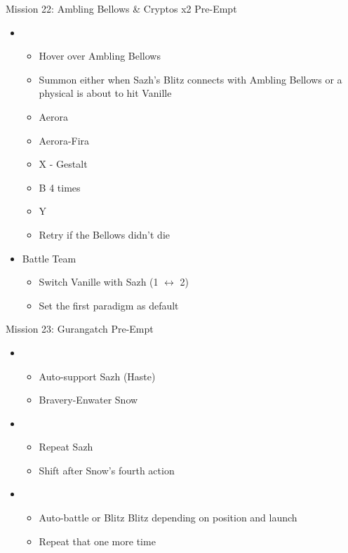 \documentclass{report}
\begin{document}
\begin{battle}{Mission 22: Ambling Bellows \& Cryptos x2 Pre-Empt}
\begin{itemize}
    \item \sixth
    \begin{itemize}
        \item Hover over Ambling Bellows
        \item Summon either when Sazh's Blitz connects with Ambling Bellows or a physical is about to hit Vanille
        \item Aerora
        \item Aerora-Fira
        \item X - Gestalt
        \item B 4 times
        \item Y
        \item Retry if the Bellows didn't die
    \end{itemize}
\end{itemize}
\end{battle}
\begin{menu}
\begin{itemize}
    \paradigm
    \begin{itemize}
        \item Battle Team
        \begin{itemize}
            \item Switch Vanille with Sazh (1 $\leftrightarrow$ 2)
            \item Set the first paradigm as default
        \end{itemize}
    \end{itemize}
\end{itemize}
\end{menu}
\begin{battle}{Mission 23: Gurangatch Pre-Empt}
\begin{itemize}
    \item \first
    \begin{itemize}
        \item Auto-support Sazh (Haste)
        \item Bravery-Enwater Snow
    \end{itemize}
    \item \fifth
    \begin{itemize}
        \item Repeat Sazh
        \item Shift after Snow's fourth action
    \end{itemize}
    \item \sixth
    \begin{itemize}
        \item Auto-battle or Blitz Blitz depending on position and launch
        \item Repeat that one more time
    \end{itemize}
\end{itemize}
\end{battle}
\end{document}
